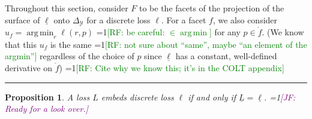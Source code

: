 \documentclass[12pt]{article}
\newcommand{\Comments}{1}
\newcommand{\mynote}[2]{\ifnum\Comments=1\textcolor{#1}{#2}\fi}
\newcommand{\raf}[1]{\mynote{green}{[RF: #1]}}
\newcommand{\jessie}[1]{\mynote{purple}{[JF: #1]}}
\newcommand{\reals}{\mathbb{R}}
\newcommand{\simplex}{\Delta_\Y}
\newcommand{\R}{\mathcal{R}}
\newcommand{\Y}{\mathcal{Y}}
\newcommand{\risk}[1]{\underline{#1}}
\newcommand{\inter}[1]{\mathring{#1}}%
\DeclareMathOperator*{\argmin}{arg\,min}
\newtheorem{proposition}{Proposition}
\begin{document}
Throughout this section, consider $F$ to be the facets of the projection of the surface of $\risk{\ell}$ onto $\simplex$ for a discrete loss $\ell$.
For a facet $f$, we also consider $u_f = \argmin_r \ell(r, p)$ \raf{be careful: $\in \argmin$} for any $p \in \inter{f}$.
(We know that this $u_f$ is the same \raf{not sure about ``same'', maybe ``an element of the argmin''} regardless of the choice of $p$ since $\risk{\ell}$ has a constant, well-defined derivative on $\inter{f}$)
\raf{Cite why we know this; it's in the COLT appendix}
\hrule
\hrulefill
\begin{proposition}\label{prop:embed-bayes-risks}
  A loss $L$ embeds discrete loss $\ell$ if and only if $\risk{L}=\risk{\ell}$.
  \jessie{Ready for a look over.}
\end{proposition}
\end{document}
